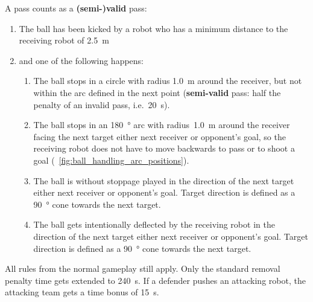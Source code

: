         A pass counts as a \textbf{(semi-)valid} pass:
        \begin{enumerate}
            \item The ball has been kicked by a robot who has a minimum distance to the receiving robot of \qty{2.5}{\metre}
            \item and one of the following happens:
            \begin{enumerate}
                \item The ball stops in a circle with radius \qty{1.0}{\metre} around the receiver, but not within the arc defined in the next point (\textbf{semi-valid} pass: half the penalty of an invalid pass, i.e.~\qty{20}{\second}).
                \item The ball stops in an \qty{180}{\degree} arc with radius~\qty{1.0}{\metre} around the receiver facing the next target either next receiver or opponent's goal, so the receiving robot does not have to move backwards to pass or to shoot a goal (\cf~\cref{fig:ball_handling_arc_positions}).
                \item The ball is without stoppage played in the direction of the next target either next receiver or opponent's goal. Target direction is defined as a \qty{90}{\degree} cone towards the next target.
                \item The ball gets intentionally deflected by the receiving robot in the direction of the next target either next receiver or opponent's goal. Target direction is defined as a \qty{90}{\degree} cone towards the next target.
            \end{enumerate}
        \end{enumerate}

        All rules from the normal gameplay still apply. Only the standard removal penalty time gets extended to \qty{240}{\second}. 
        If a defender pushes an attacking robot, the attacking team gets a time bonus of \qty{15}{\second}.

